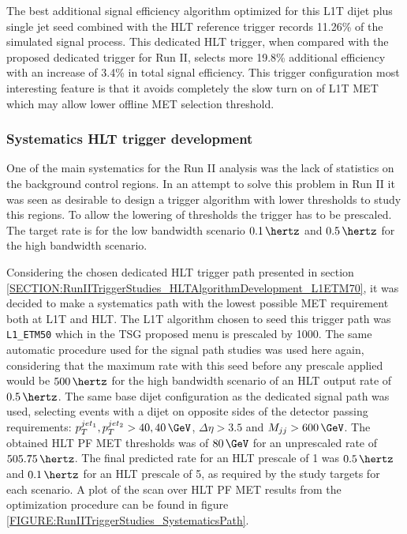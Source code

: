 The best additional signal efficiency algorithm optimized for this \gls{L1T} dijet plus single jet seed combined with the \gls{HLT} reference trigger records 11.26\% of the simulated signal process. This dedicated \gls{HLT} trigger, when compared with the proposed dedicated trigger for Run II, selects more 19.8\% additional efficiency with an increase of 3.4\% in total signal efficiency. This trigger configuration most interesting feature is that it avoids completely the slow turn on of \gls{L1T} \gls{MET} which may allow lower offline \gls{MET} selection threshold.

\subsubsection{Systematics HLT trigger development}
\label{SECTION:RunIITriggerStudies_HLTAlgorithmDevelopment_SystematicsPath}


One of the main systematics for the Run II analysis was the lack of statistics on the background control regions. In an attempt to solve this problem in Run II it was seen as desirable to design a trigger algorithm with lower thresholds to study this regions. To allow the lowering of thresholds the trigger has to be prescaled. The target rate is for the low bandwidth scenario $0.1\,\hertz$ and $0.5\,\hertz$ for the high bandwidth scenario.

Considering the chosen dedicated \gls{HLT} trigger path presented in section \ref{SECTION:RunIITriggerStudies_HLTAlgorithmDevelopment_L1ETM70}, it was decided to make a systematics path with the lowest possible \gls{MET} requirement both at \gls{L1T} and \gls{HLT}. The \gls{L1T} algorithm chosen to seed this trigger path was \verb|L1_ETM50| which in the \gls{TSG} proposed menu is prescaled by 1000. The same automatic procedure used for the signal path studies was used here again, considering that the maximum rate with this seed before any prescale applied would be $500\,\hertz$ for the high bandwidth scenario of an \gls{HLT} output rate of $0.5\,\hertz$. The same base dijet configuration as the dedicated signal path was used, selecting events with a dijet on opposite sides of the detector passing requirements: $p_T^{jet_1},p_T^{jet_2}>40,40\,\GeV$, $\Delta\eta>3.5$ and $M_{jj}>600\,\GeV$. The obtained \gls{HLT} \gls{PF} \gls{MET} thresholds was of $80\,\GeV$ for an unprescaled rate of $505.75\,\hertz$. The final predicted rate for an \gls{HLT} prescale of 1 was $0.5\,\hertz$ and $0.1\,\hertz$ for an \gls{HLT} prescale of 5, as required by the study targets for each scenario. A plot of the scan over \gls{HLT} \gls{PF} \gls{MET} results from the optimization procedure can be found in figure \ref{FIGURE:RunIITriggerStudies_SystematicsPath}.

